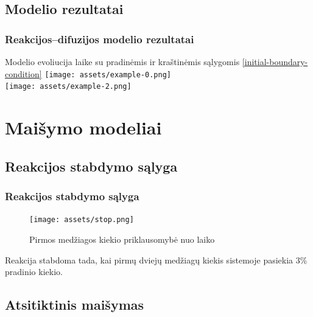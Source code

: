\documentclass{beamer}
\begin{document}
\subsection{Modelio rezultatai}

\begin{frame}
  \frametitle{Reakcijos--difuzijos modelio rezultatai}
  Modelio evoliucija laike su pradinėmis ir kraštinėmis sąlygomis \eqref{initial-boundary-condition}
  \centering
  \texttt{[image: assets/example-0.png]} \\ 
  \texttt{[image: assets/example-2.png]}
\end{frame}

\section{Maišymo modeliai}
\subsection{Reakcijos stabdymo sąlyga}

\begin{frame}
  \frametitle{Reakcijos stabdymo sąlyga}

  \centering
  \begin{figure}
    \texttt{[image: assets/stop.png]}
    \caption{Pirmos medžiagos kiekio priklausomybė nuo laiko}
  \end{figure}
  Reakcija stabdoma tada, kai pirmų dviejų medžiagų kiekis sistemoje pasiekia 3\% pradinio kiekio.
\end{frame}

\subsection{Atsitiktinis maišymas}
\end{document}
